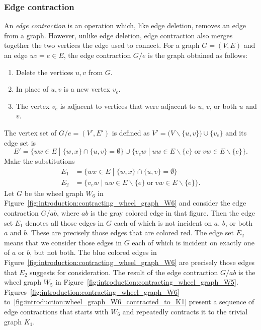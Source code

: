 
\subsubsection{Edge contraction}

An \emph{edge contraction} is an operation
which, like edge deletion, removes an edge from a graph. However,
unlike edge deletion, edge contraction also merges together the two
vertices the edge used to connect. For a graph $G = (V, E)$ and an
edge $uv = e \in E$, the edge contraction $G/e$ is the graph obtained
as follows:
\begin{enumerate}
\item Delete the vertices $u,v$ from $G$.

\item In place of $u,v$ is a new vertex $v_e$.

\item The vertex $v_e$ is adjacent to vertices that were adjacent
  to $u$, $v$, or both $u$ and $v$.
\end{enumerate}
The vertex set of $G/e = (V', E')$ is defined as
$V' = \big(V \backslash \{u,v\}\big) \cup \{v_e\}$ and its edge set is
\[
E'
=
\big\{
wx \in E \;\left.\right|\; \{w,x\} \cap \{u,v\} = \emptyset
\big\}
\cup
\big\{
v_e w
\;\left.\right|\;
uw \in E \backslash \{e\} \;\text{or}\; vw \in E \backslash \{e\}
\big\}.
\]
Make the substitutions
\begin{align*}
E_1 &= \big\{
wx \in E \;\left.\right|\; \{w,x\} \cap \{u,v\} = \emptyset \big\} \\
E_2 &= \big\{
v_e w \;\left.\right|\;
uw \in E \backslash \{e\} \;\text{or}\; vw \in E \backslash \{e\} \big\}.
\end{align*}
Let $G$ be the wheel graph $W_6$ in
Figure~\ref{fig:introduction:contracting_wheel_graph_W6} and consider
the edge contraction $G/ab$, where $ab$ is the gray colored edge in
that figure. Then the edge set $E_1$ denotes all those edges in $G$
each of which is not incident on $a$, $b$, or both $a$ and $b$. These
are precisely those edges that are colored red. The edge set $E_2$
means that we consider those edges in $G$ each of which is incident on
exactly one of $a$ or $b$, but not both. The blue colored edges in
Figure~\ref{fig:introduction:contracting_wheel_graph_W6} are precisely
those edges that $E_2$ suggests for consideration. The result of the
edge contraction $G/ab$ is the wheel graph $W_5$ in
Figure~\ref{fig:introduction:contracting_wheel_graph_W5}.
Figures~\ref{fig:introduction:contracting_wheel_graph_W6}
to~\ref{fig:introduction:wheel_graph_W6_contracted_to_K1} present a
sequence of edge contractions that starts with $W_6$ and repeatedly
contracts it to the trivial graph $K_1$.

